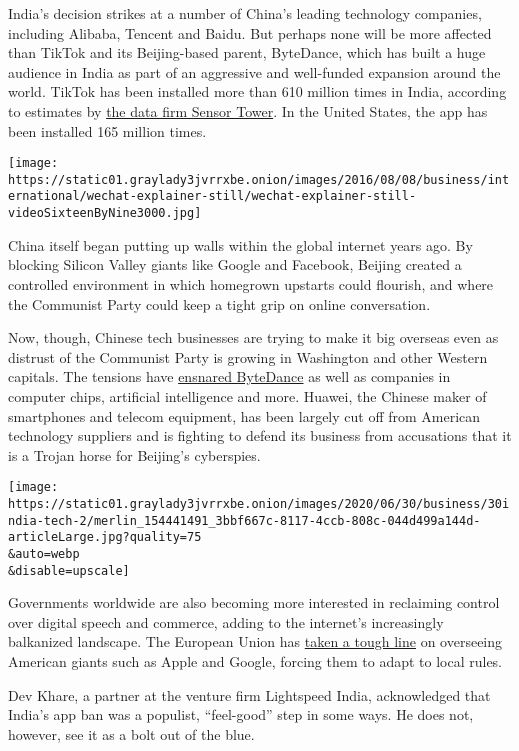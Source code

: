 India's decision strikes at a number of China's leading technology
companies, including Alibaba, Tencent and Baidu. But perhaps none will
be more affected than TikTok and its Beijing-based parent, ByteDance,
which has built a huge audience in India as part of an aggressive and
well-funded expansion around the world. TikTok has been installed more
than 610 million times in India, according to estimates by
\href{https://sensortower.com/blog/tiktok-downloads-2-billion}{the data
firm Sensor Tower}. In the United States, the app has been installed 165
million times.

\texttt{[image: https://static01.graylady3jvrrxbe.onion/images/2016/08/08/business/international/wechat-explainer-still/wechat-explainer-still-videoSixteenByNine3000.jpg]}

China itself began putting up walls within the global internet years
ago. By blocking Silicon Valley giants like Google and Facebook, Beijing
created a controlled environment in which homegrown upstarts could
flourish, and where the Communist Party could keep a tight grip on
online conversation.

Now, though, Chinese tech businesses are trying to make it big overseas
even as distrust of the Communist Party is growing in Washington and
other Western capitals. The tensions have
\href{https://www.nytimes3xbfgragh.onion/2019/11/18/technology/tiktok-alex-zhu-interview.html}{ensnared
ByteDance} as well as companies in computer chips, artificial
intelligence and more. Huawei, the Chinese maker of smartphones and
telecom equipment, has been largely cut off from American technology
suppliers and is fighting to defend its business from accusations that
it is a Trojan horse for Beijing's cyberspies.

\texttt{[image: https://static01.graylady3jvrrxbe.onion/images/2020/06/30/business/30india-tech-2/merlin\_154441491\_3bbf667c-8117-4ccb-808c-044d499a144d-articleLarge.jpg?quality=75\\\&auto=webp\\\&disable=upscale]}

Governments worldwide are also becoming more interested in reclaiming
control over digital speech and commerce, adding to the internet's
increasingly balkanized landscape. The European Union has
\href{https://www.nytimes3xbfgragh.onion/2019/11/19/technology/tech-regulator-europe.html}{taken
a tough line} on overseeing American giants such as Apple and Google,
forcing them to adapt to local rules.

Dev Khare, a partner at the venture firm Lightspeed India, acknowledged
that India's app ban was a populist, ``feel-good'' step in some ways. He
does not, however, see it as a bolt out of the blue.

